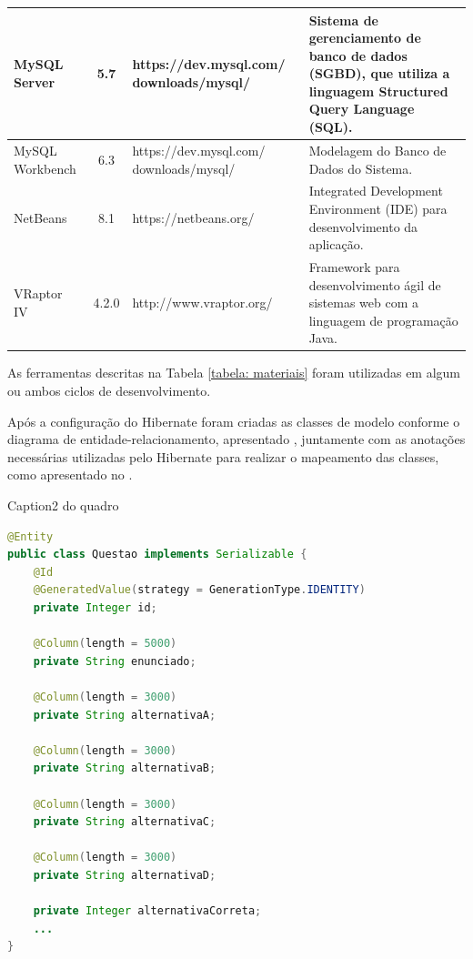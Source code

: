 \begin{center}
\begin{longtable}{|C{3.0 cm}|c|C{4.5 cm}|L{5cm}|}
MySQL Server                     & 5.7             & https://dev.mysql.com/
downloads/mysql/                             & Sistema de gerenciamento de banco de dados (SGBD), que utiliza a linguagem Structured Query Language (SQL).                                            \\ \hline
MySQL Workbench                  & 6.3             & https://dev.mysql.com/
downloads/mysql/                             & Modelagem do Banco de Dados do Sistema.                                                                                                                \\ \hline
NetBeans                         & 8.1             & https://netbeans.org/                                              & Integrated Development Environment (IDE) para desenvolvimento da aplicação.                                                                            \\ \hline
VRaptor IV                       & 4.2.0           & http://www.vraptor.org/                                            & Framework para desenvolvimento ágil de sistemas web com a linguagem de programação Java. \\ \hline
\end{longtable}
\end{center}

As ferramentas descritas na Tabela \ref{tabela: materiais} foram utilizadas em algum ou ambos ciclos de desenvolvimento. 


Após a configuração do Hibernate foram criadas as classes de modelo conforme o diagrama de entidade-relacionamento, apresentado , juntamente com as anotações necessárias utilizadas pelo Hibernate para realizar o mapeamento das classes, como apresentado no .

\begin{codigo}
\caption{Caption2 do quadro}
\label{codigo_modelo2}

\begin{lstlisting}[language=Java]
@Entity
public class Questao implements Serializable {
    @Id
    @GeneratedValue(strategy = GenerationType.IDENTITY)
    private Integer id;
    
    @Column(length = 5000)
    private String enunciado;
    
    @Column(length = 3000)
    private String alternativaA;
    
    @Column(length = 3000)
    private String alternativaB;
    
    @Column(length = 3000)
    private String alternativaC;
    
    @Column(length = 3000)
    private String alternativaD;
    
    private Integer alternativaCorreta;
	... 
}
\end{lstlisting}
\end{codigo}

